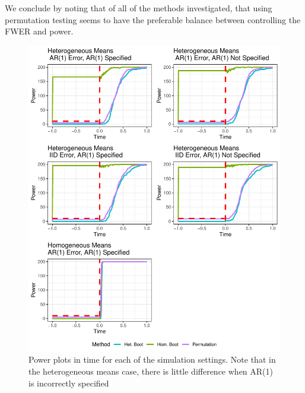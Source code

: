 \documentclass{article}
\begin{document}
We conclude by noting that of all of the methods investigated, that using permutation testing seems to have the preferable balance between controlling the FWER and power. 


\begin{figure}
\centering
\includegraphics[scale=1]{full_power_25.pdf}
\caption{Power plots in time for each of the simulation settings. Note that in the heterogeneous means case, there is little difference when AR(1) is incorrectly specified}
\label{fig:time_power_plot_full}
\end{figure}
\end{document}
